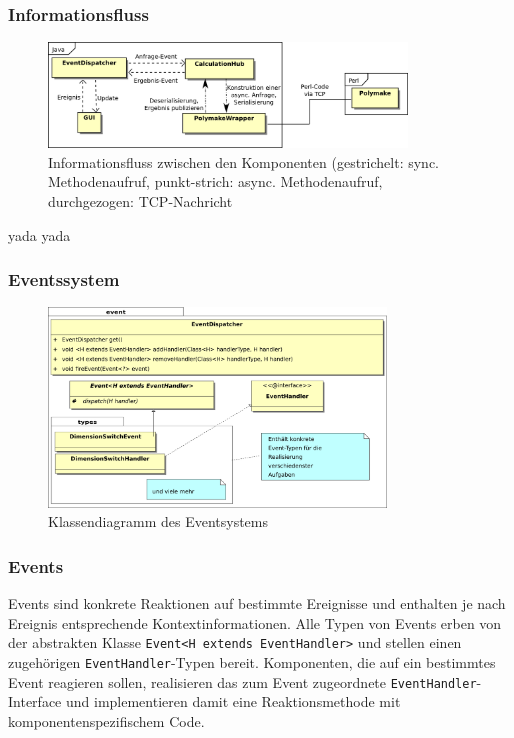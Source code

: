     \subsubsection{Informationsfluss\label{ssec:flow}}
        \begin{figure}[tbh]
            \centering
            \includegraphics[width=0.85\textwidth]{img/flow}
            \caption{Informationsfluss zwischen den Komponenten
                      {\scriptsize(gestrichelt: sync. Methodenaufruf, punkt-strich: async. Methodenaufruf, durchgezogen: TCP-Nachricht}}
        \end{figure}

        yada yada 
    \subsubsection{Eventssystem\label{ssec:event}}
        \begin{figure}[bht]
            \centering
            \includegraphics[width=0.8\textwidth]{img/event_classdiagram2}
            \caption{Klassendiagramm des Eventsystems}
        \end{figure}
        \subsubsection*{Events}
            Events sind konkrete Reaktionen auf bestimmte Ereignisse und enthalten je nach Ereignis entsprechende Kontextinformationen.
            Alle Typen von Events erben von der abstrakten Klasse \lstinline|Event<H extends EventHandler>| und stellen einen
            zugehörigen \lstinline|EventHandler|-Typen bereit.
            Komponenten, die auf ein bestimmtes Event reagieren sollen, realisieren das zum Event zugeordnete
            \lstinline|EventHandler|-Interface und implementieren damit eine Reaktionsmethode mit komponentenspezifischem
            Code.

